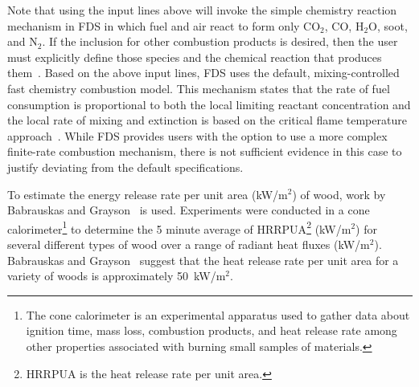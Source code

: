 \documentclass[12pt,oneside]{book}
\begin{document}
Note that using the input lines above will invoke the simple chemistry reaction mechanism in FDS in which fuel and air react to form only CO$_2$, CO, H$_2$O, soot, and N$_2$. If the inclusion for other combustion products is desired, then the user must explicitly define those species and the chemical reaction that produces them~\cite{FDS_Users_Guide}. Based on the above input lines, FDS uses the default, mixing-controlled fast chemistry combustion model. This mechanism states that the rate of fuel consumption is proportional to both the local limiting reactant concentration and the local rate of mixing and extinction is based on the critical flame temperature approach~\cite{FDS_Math_Guide}. While FDS provides users with the option to use a more complex finite-rate combustion mechanism, there is not sufficient evidence in this case to justify deviating from the default specifications. 

To estimate the energy release rate per unit area (kW/m$^2$) of wood, work by Babrauskas and Grayson~\cite{babrauskas1990} is used. Experiments were conducted in a cone calorimeter\footnote{The cone calorimeter is an experimental apparatus used to gather data about ignition time, mass loss, combustion products, and heat release rate among other properties associated with burning small samples of materials.} to determine the 5 minute average of HRRPUA\footnote{HRRPUA is the heat release rate per unit area.} (kW/m$^2$) for several different types of wood over a range of radiant heat fluxes (kW/m$^2$). Babrauskas and Grayson~\cite{babrauskas1990} suggest that the heat release rate per unit area for a variety of woods is approximately 50~kW/m$^2$.
\end{document}
